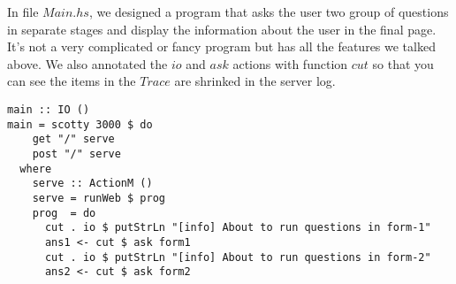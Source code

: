 \documentclass[10pt]{article}
\begin{document}
In file $Main.hs$, we designed a program that asks the user two group of questions in separate stages and display the information about the user in the final page. It's not a very complicated or fancy program but has all the features we talked above. We also annotated the $io$ and $ask$ actions with function $cut$ so that you can see the items in the $Trace$ are shrinked in the server log.
\begin{lstlisting}
main :: IO ()                                                                                                                                                                                 
main = scotty 3000 $ do                                                                                                                                                                       
    get "/" serve                                                                                                                                                                             
    post "/" serve                                                                                                                                                                            
  where                                                                                                                                                                                       
    serve :: ActionM ()                                                                                                                                                                       
    serve = runWeb $ prog                                                                                                                                                                     
    prog  = do                                                                                                                                                                                
      cut . io $ putStrLn "[info] About to run questions in form-1"                                                                                                                           
      ans1 <- cut $ ask form1                                                                                                                                                                 
      cut . io $ putStrLn "[info] About to run questions in form-2"                                                                                                                           
      ans2 <- cut $ ask form2                                                                                                                                                                 

\end{lstlisting}
\end{document}
